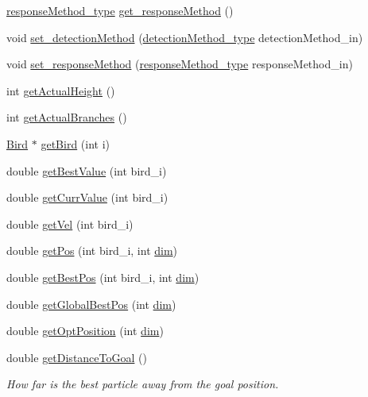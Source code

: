 \begin{CompactItemize}
\item 
\hyperlink{pso_8h_0c2464ff08436288377b981af15bbb6d}{responseMethod\_\-type} \hyperlink{classPSO_186e39f740e5e1ed2dcf8ce07b9eae7a}{get\_\-responseMethod} ()
\item 
void \hyperlink{classPSO_b86ed161b8395184cce4379614d2b272}{set\_\-detectionMethod} (\hyperlink{pso_8h_ea087f59f65df7bbf4798bccd8a02416}{detectionMethod\_\-type} detectionMethod\_\-in)
\item 
void \hyperlink{classPSO_f627d2f230f5437ded30e32528c2dd72}{set\_\-responseMethod} (\hyperlink{pso_8h_0c2464ff08436288377b981af15bbb6d}{responseMethod\_\-type} responseMethod\_\-in)
\item 
int \hyperlink{classPSO_07a591196487df7cbad1b991c30b1123}{getActualHeight} ()
\item 
int \hyperlink{classPSO_99de54b6a85ef0b84b02edc7c86533e0}{getActualBranches} ()
\item 
\hyperlink{classBird}{Bird} $\ast$ \hyperlink{classPSO_4a7b5aff906eeaa97bd985c690b78492}{getBird} (int i)
\item 
double \hyperlink{classPSO_f1b0098355740260c05223e08d5ed677}{getBestValue} (int bird\_\-i)
\item 
double \hyperlink{classPSO_d8d4aebf8fbdafe174bb58fc013b565e}{getCurrValue} (int bird\_\-i)
\item 
double \hyperlink{classPSO_196c4f05616dce8974e8033d8ddbf799}{getVel} (int bird\_\-i)
\item 
double \hyperlink{classPSO_1bfc5f45a50fa13a8d11231ca522095a}{getPos} (int bird\_\-i, int \hyperlink{classPSO_4f1ce768b59640f64ed2b270764b32b1}{dim})
\item 
double \hyperlink{classPSO_7550f99f2e4bb038843e6cfbfebc6c11}{getBestPos} (int bird\_\-i, int \hyperlink{classPSO_4f1ce768b59640f64ed2b270764b32b1}{dim})
\item 
double \hyperlink{classPSO_069d1e4640bc7be42e7d977d65365240}{getGlobalBestPos} (int \hyperlink{classPSO_4f1ce768b59640f64ed2b270764b32b1}{dim})
\item 
double \hyperlink{classPSO_520531a87cb937666bb07cd19543e43b}{getOptPosition} (int \hyperlink{classPSO_4f1ce768b59640f64ed2b270764b32b1}{dim})
\item 
double \hyperlink{classPSO_6c8d9673578e234799b4f66605900eb3}{getDistanceToGoal} ()
\begin{CompactList}\small\item\em How far is the best particle away from the goal position. \item\end{CompactList}\item 

\end{CompactItemize}
